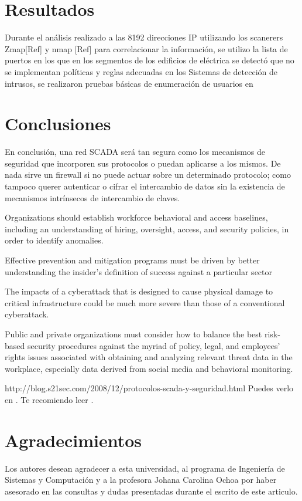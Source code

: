 \documentclass[jou,apacite]{apa6}   %
\begin{document}
\section{Resultados }
Durante el análisis realizado a las 8192 direcciones IP utilizando los scanerers Zmap[Ref] y nmap [Ref] para correlacionar la información, se utilizo la lista de puertos en los que  en los segmentos de los edificios de eléctrica se detectó que no se implementan políticas y reglas adecuadas en los  Sistemas de detección de intrusos, se realizaron pruebas básicas de enumeración de usuarios en 

\section{Conclusiones }
En conclusión, una red SCADA será tan segura como los  mecanismos de seguridad que incorporen sus protocolos o puedan aplicarse a los mismos. De nada sirve un firewall si no puede actuar sobre un determinado protocolo; como tampoco querer autenticar o cifrar el intercambio de datos sin la existencia de mecanismos intrínsecos de intercambio de claves.

Organizations should establish workforce behavioral and access baselines, including
an understanding of hiring, oversight, access, and security policies, in order to identify
anomalies.

Effective prevention and mitigation programs must be driven by better understanding
the insider’s definition of success against a particular sector

The impacts of a cyberattack that is designed to cause physical damage to critical
infrastructure could be much more severe than those of a conventional cyberattack.

Public and private organizations must consider how to balance the best risk-based
security procedures against the myriad of policy, legal, and employees’ rights issues
associated with obtaining and analyzing relevant threat data in the workplace,
especially data derived from social media and behavioral monitoring.

http://blog.s21sec.com/2008/12/protocolos-scada-y-seguridad.html
Puedes verlo en \cite{Patricio2011}. Te recomiendo leer \cite{Patricio2011, Zacarias2009, Alfonso2010b, Alfonso2010a}.

\section{Agradecimientos }
Los autores desean agradecer a esta universidad, al programa de Ingeniería de Sistemas y Computación y a la profesora Johana Carolina Ochoa por haber asesorado en las consultas y dudas presentadas durante el escrito de este articulo.
\end{document}
